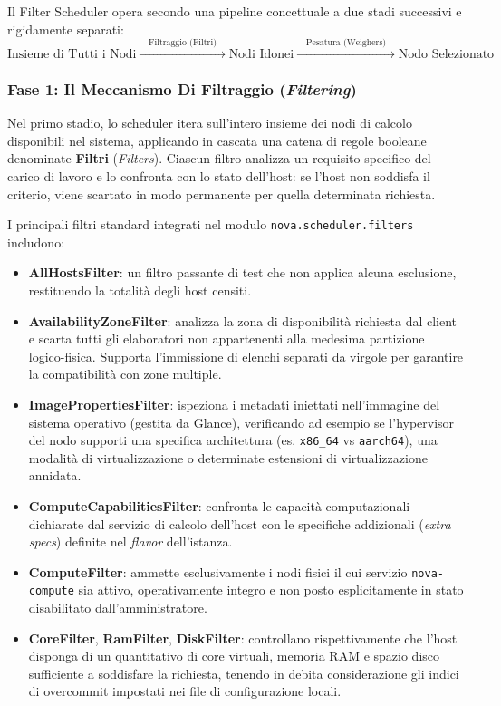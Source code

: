 \documentclass[11pt, a4paper]{article}
\begin{document}

Il Filter Scheduler opera secondo una pipeline concettuale a due stadi successivi e rigidamente separati:
\[
    \text{Insieme di Tutti i Nodi} \xrightarrow{\quad\text{Filtraggio (Filtri)}\quad} \text{Nodi Idonei} \xrightarrow{\quad\text{Pesatura (Weighers)}\quad} \text{Nodo Selezionato}
\]

\subsubsection{Fase 1: Il Meccanismo Di Filtraggio (\emph{Filtering})}

Nel primo stadio, lo scheduler itera sull'intero insieme dei nodi di calcolo disponibili nel sistema, applicando in cascata una catena di regole booleane denominate \textbf{Filtri} (\emph{Filters}). Ciascun filtro analizza un requisito specifico del carico di lavoro e lo confronta con lo stato dell'host: se l'host non soddisfa il criterio, viene scartato in modo permanente per quella determinata richiesta.

I principali filtri standard integrati nel modulo \texttt{nova.scheduler.filters} includono:
\begin{itemize}[leftmargin=*]
    \item \textbf{AllHostsFilter}: un filtro passante di test che non applica alcuna esclusione, restituendo la totalità degli host censiti.
    \item \textbf{AvailabilityZoneFilter}: analizza la zona di disponibilità richiesta dal client e scarta tutti gli elaboratori non appartenenti alla medesima partizione logico-fisica. Supporta l'immissione di elenchi separati da virgole per garantire la compatibilità con zone multiple.
    \item \textbf{ImagePropertiesFilter}: ispeziona i metadati iniettati nell'immagine del sistema operativo (gestita da Glance), verificando ad esempio se l'hypervisor del nodo supporti una specifica architettura (es. \texttt{x86\_64} vs \texttt{aarch64}), una modalità di virtualizzazione o determinate estensioni di virtualizzazione annidata.
    \item \textbf{ComputeCapabilitiesFilter}: confronta le capacità computazionali dichiarate dal servizio di calcolo dell'host con le specifiche addizionali (\emph{extra specs}) definite nel \emph{flavor} dell'istanza.
    \item \textbf{ComputeFilter}: ammette esclusivamente i nodi fisici il cui servizio \texttt{nova-compute} sia attivo, operativamente integro e non posto esplicitamente in stato disabilitato dall'amministratore.
    \item \textbf{CoreFilter}, \textbf{RamFilter}, \textbf{DiskFilter}: controllano rispettivamente che l'host disponga di un quantitativo di core virtuali, memoria RAM e spazio disco sufficiente a soddisfare la richiesta, tenendo in debita considerazione gli indici di overcommit impostati nei file di configurazione locali.
\end{itemize}
\end{document}
